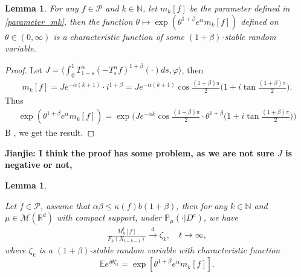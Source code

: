 \documentclass[12pt,oneside,english]{amsart}
\theoremstyle{plain}
\newtheorem{lem}[thm]{Lemma}
\theoremstyle{definition}
\numberwithin{equation}{section}
\begin{document}
\begin{lem}
For any $f\in \mathcal{P}$ and $k\in \mathbb{N}$, let $m_k[f]$ be the parameter defined in \eqref{parameter_mk}, then the function $\theta\mapsto \exp(\theta^{1+\beta}e^{\alpha}m_k[f])$ defined on $\theta\in(0,\infty)$ is a characteristic function of some $(1+\beta)$-stable random variable.
\end{lem}
\begin{proof}
    Let $J=\langle\int_0^1 T_{1-s}^{\alpha}(-T^{\alpha}_s f)^{1+\beta}(\cdot)ds,\varphi\rangle$, then
    \begin{align}
        m_k[f]=J e^{-\alpha(k+1)}\cdot i^{1+\beta}=J e^{-\alpha(k+1)}\cos\frac{(1+\beta)\pi}{2}\big(1+i\tan\frac{(1+\beta)\pi}{2}\big).
    \end{align}
Thus
\begin{align}
    \exp(\theta^{1+\beta}e^{\alpha}m_k[f])=\exp\big(J e^{-\alpha k}\cos\frac{(1+\beta)\pi}{2}\cdot\theta^{1+\beta}\big(1+i\tan\frac{(1+\beta)\pi}{2}\big)\big)
\end{align}
B \cite[Theorem 14.15]{Sato1990Levy}, we get the result.
\end{proof}
{\bf Jianjie: I think the proof has some problem, as we are not sure $J$ is negative or not,}
\begin{lem}\label{lemma33}

 Let $f\in \mathcal{P}$, assume that $\alpha\beta\leq \kappa(f)b(1+\beta)$, then for any  $k\in\mathbb{N}$ and $\mu \in \mathcal{M}(\mathbb{R}^d)$ with compact support, under $\mathbb{P}_{\mu}(\cdot | D ^c)$, we have
 \begin{align}
      \frac{M_k^t[f]}{F_k(X_{t-k-1})}\xrightarrow{d}\zeta_k, \quad t\rightarrow \infty, \label{limitdistribution1}
 \end{align}
 where $\zeta_k$ is a $(1+\beta)$-stable random variable with characteristic function
 $$\mathbb{E}e^{i\theta\zeta_k}=\exp\left[\theta^{1+\beta}e^{\alpha}m_k[f]\right].$$
 \end{lem}
\end{document}
